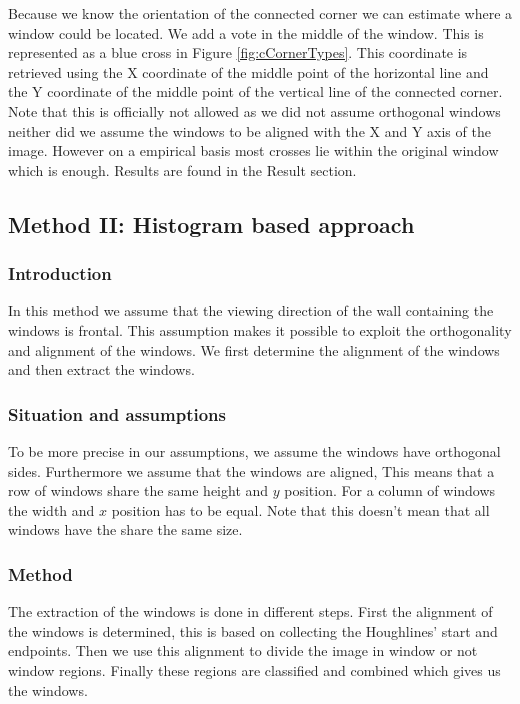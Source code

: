 Because we know the orientation of the connected corner we can estimate where
a window could be located.  We add a vote in the middle of the window. 
This is represented as a blue cross in Figure \ref{fig:cCornerTypes}.
This coordinate is retrieved using the X coordinate of the middle point of the horizontal line
and the Y coordinate of the middle point of the vertical line of the connected corner.  
Note that this is officially not allowed as we did not assume orthogonal windows
neither did we assume the windows to be aligned with the X and Y axis of the
image. However on a empirical basis most crosses lie within the original window
which is enough. Results are found in the Result section.


\subsection{Method II: Histogram based approach} 
\subsubsection{Introduction}
In this method we assume that the viewing direction of the wall containing the 
windows is frontal. This assumption makes it possible to exploit the orthogonality and
alignment of the windows. We first determine the alignment of the windows and
then extract the windows. 


\subsubsection{Situation and assumptions}
To be more precise in our assumptions, we assume the windows have orthogonal sides.  Furthermore we
assume that the windows are aligned, This means that a row of windows share the
same height and $y$ position. For a column of windows the width and $x$
position has to be equal.  Note that this doesn't mean that all windows have the
share the same size.

\subsubsection{Method}
The extraction of the windows is done in different steps. 
First the alignment of the windows is determined, this is based on collecting
the Houghlines' start and endpoints. Then we use this alignment to divide the
image in window or not window regions.  Finally these regions are classified
and combined which gives us the windows.


